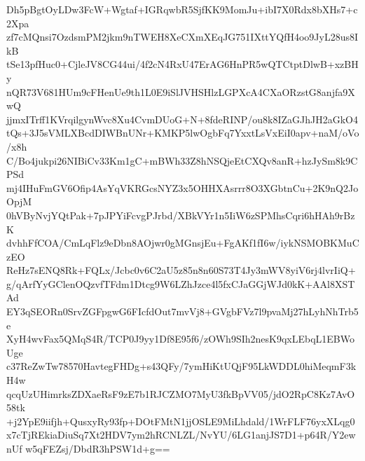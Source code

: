 Dh5pBgtOyLDw3FcW+Wgtaf+IGRqwbR5SjfKK9MomJu+ibI7X0Rdx8bXHs7+c2Xpa
zf7cMQnsi7OzdsmPM2jkm9nTWEH8XeCXmXEqJG751IXttYQfH4oo9JyL28us8IkB
tSe13pfHuc0+CjleJV8CG44ui/4f2cN4RxU47ErAG6HnPR5wQTCtptDlwB+xzBHy
nQR73V681HUm9cFHenUe9th1L0E9iSlJVHSHlzLGPXcA4CXaORzstG8anjfa9XwQ
jjmxITrff1KVrqilgynWvc8Xu4CvmDUoG+N+8fdeRINP/ou8k8IZaGJhJH2aGkO4
tQs+3J5sVMLXBcdDIWBnUNr+KMKP5lwOgbFq7YxxtLsVxEiI0apv+naM/oVo/x8h
C/Bo4jukpi26NIBiCv33Km1gC+mBWh33Z8hNSQjeEtCXQv8anR+hzJySm8k9CPSd
mj4IHuFmGV6Ofip4AsYqVKRGcsNYZ3x5OHHXAsrrr8O3XGbtnCu+2K9nQ2JoOpjM
0hVByNvjYQtPak+7pJPYiFcvgPJrbd/XBkVYr1n5IiW6zSPMhsCqri6hHAh9rBzK
dvhhFfCOA/CmLqFlz9eDbn8AOjwr0gMGnsjEu+FgAKf1fI6w/iykNSMOBKMuCzEO
ReHz7sENQ8Rk+FQLx/Jcbc0v6C2aU5z85n8n60S73T4Jy3mWV8yiV6rj4lvrIiQ+
g/qArfYyGClenOQzvfTFdm1Dtcg9W6LZhJzce4l5fxCJaGGjWJd0kK+AAl8XSTAd
EY3qSEORn0SrvZGFpgwG6FIcfdOut7mvVj8+GVgbFVz7l9pvaMj27hLyhNhTrb5e
XyH4wvFax5QMqS4R/TCP0J9yy1Df8E95f6/zOWh9SIh2nesK9qxLEbqL1EBWoUge
c37ReZwTw78570HavtegFHDg+s43QFy/7ymHiKtUQjF95LkWDDL0hiMeqmF3kH4w
qcqUzUHimrksZDXaeRsF9zE7b1RJCZMO7MyU3fkBpVV05/jdO2RpC8Kz7AvO58tk
+j2YpE9iifjh+QusxyRy93fp+DOtFMtN1jjOSLE9MiLhdald/1WrFLF76yxXLqg0
x7cTjREkiaDiuSq7Xt2HDV7ym2hRCNLZL/NvYU/6LG1anjJS7D1+p64R/Y2ewnUf
w5qFEZsj/DbdR3hPSW1d+g==
